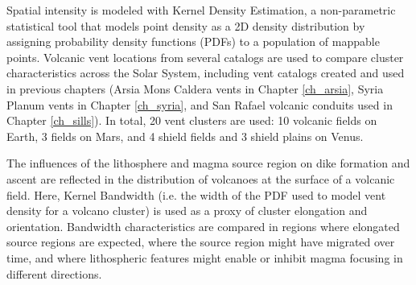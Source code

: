 Spatial intensity is modeled with Kernel Density Estimation, a non-parametric statistical tool that models point density as a 2D density distribution by assigning probability density functions (PDFs) to a population of mappable points. Volcanic vent locations from several catalogs are used to compare cluster characteristics across the Solar System, including vent catalogs created and used in previous chapters (Arsia Mons Caldera vents in Chapter \ref{ch_arsia}, Syria Planum vents in Chapter \ref{ch_syria}, and San Rafael volcanic conduits used in Chapter \ref{ch_sills}). In total, 20 vent clusters are used: 10 volcanic fields on Earth, 3 fields on Mars, and 4 shield fields and 3 shield plains on Venus. 

The influences of the lithosphere and magma source region on dike formation and ascent are reflected in the distribution of volcanoes at the surface of a volcanic field. Here, Kernel Bandwidth (i.e. the width of the PDF used to model vent density for a volcano cluster) is used as a proxy of cluster elongation and orientation. Bandwidth characteristics are compared in regions where elongated source regions are expected, where the source region might have migrated over time, and where lithospheric features might enable or inhibit magma focusing in different directions.



% 
